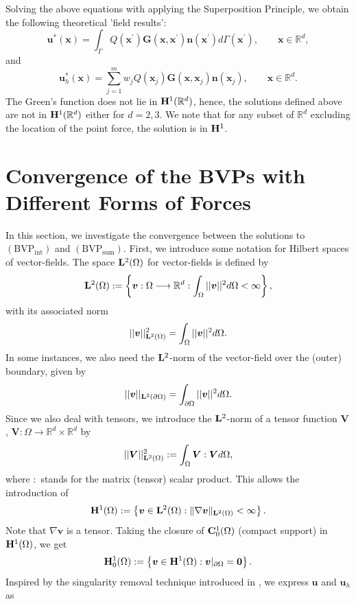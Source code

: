 \documentclass[pdflatex,sn-mathphys-num]{sn-jnl}
\newtheorem*{lemma star}{Lemma}
\begin{document}
Solving the above equations with applying the Superposition Principle, we obtain the following theoretical 'field results':
\begin{equation}
\boldsymbol{u}^{\ast }(\boldsymbol{x})=\int_{\Gamma }Q(\boldsymbol{x}%
^{\prime })\boldsymbol{G}(\boldsymbol{x},\boldsymbol{x}^{\prime })%
\boldsymbol{n}(\boldsymbol{x}^{\prime })d\Gamma (\boldsymbol{x}^{\prime
}), \qquad {\boldsymbol x} \in \mathbb{R}^d,  \label{eq:u_star}
\end{equation}
and 
\begin{equation}
{\boldsymbol{u}}_{h}^{\ast }({\boldsymbol{x}})=\sum\limits_{j=1}^{m} w_j Q(%
\boldsymbol{x}_{j})\boldsymbol{G}(\boldsymbol{x},\boldsymbol{x}_{j})%
\boldsymbol{n}(\boldsymbol{x}_{j}), \qquad {\boldsymbol x} \in \mathbb{R}^d.  \label{eq:u_h_star}
\end{equation}%
The Green's function does not lie in ${\bf H}^1(\mathbb{R}^d)$, hence, the solutions defined above are not in ${\bf H}^1(\mathbb{R}^d)$ either for $d = 2,3$. We note that for any subset of $\mathbb{R}^d$ excluding the location of the point force, the solution is in ${\bf H}^1$.

\section{Convergence of the BVPs with Different Forms of Forces}
\label{sec:3}
In this section, we investigate the convergence between the solutions to $\mathrm{(BVP_{int})}$ and $\mathrm{(BVP_{sum})}$. First, we introduce some notation for Hilbert spaces of vector-fields. The space ${\bf L}^2(\Omega)$ for vector-fields is defined by
\[
{\bf L}^2(\Omega) := \left\{ {\boldsymbol v}: \Omega \longrightarrow \mathbb{R}^d: \int_{\Omega} ||{\boldsymbol v}||^2 d \Omega < \infty\right\}, 
\]
with its associated norm
\[
||{\boldsymbol v}||^2_{{\bf L}^2(\Omega)} = \int_{\Omega} || {\boldsymbol v} ||^2 d \Omega.
\]
In some instances, we also need the ${\bf L}^2$-norm of the vector-field over the (outer) boundary, given by
\[
|| {\boldsymbol v} ||_{{\bf L}^2(\partial \Omega)} =
\int_{\partial \Omega} || {\boldsymbol v} ||^2 d \Omega.
\]
Since we also deal with tensors, we introduce the ${\bf L}^2$-norm of a tensor function $\boldsymbol V$, ${\boldsymbol V}:\Omega \longrightarrow \mathbb{R}^d \times \mathbb{R}^d$ by
\[ 
|| {\boldsymbol V} ||^2_{{\bf L}^2(\Omega)} := 
\int_{\Omega} {\boldsymbol V} : {\boldsymbol V} d \Omega,
\]
where $:$ stands for the matrix (tensor) scalar product.
This allows the introduction of 
\[
{\bf H}^1(\Omega) := \left\{ {\boldsymbol v} \in {\bf L}^2(\Omega):  \|\nabla {\boldsymbol v}\|_{{{\bf L}^2}(\Omega)} < \infty \right\}.
\]
Note that $\nabla {\boldsymbol v}$ is a tensor.
Taking the closure of ${\bf C}^1_0(\Omega)$ (compact support) in ${\bf H}^1(\Omega)$, we get
\[
{\bf H}_0^1(\Omega) := \left\{ {\boldsymbol v} \in {\bf H}^1(\Omega) : {\boldsymbol v}|_{\partial \Omega} = {\bf 0}  \right\}.
\]
Inspired by the singularity removal technique introduced in \citet{Gjerde_2019}, we express $\boldsymbol{u}$ and $\boldsymbol{u}_h$ as 
\end{document}
